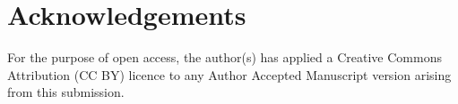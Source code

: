 \documentclass[10pt,sigconf]{acmart}
\begin{document}
\section{Acknowledgements}



For the purpose of open access, the author(s) has applied a Creative
Commons Attribution (CC BY) licence to any Author Accepted Manuscript
version arising from this submission.

%





\end{document}
